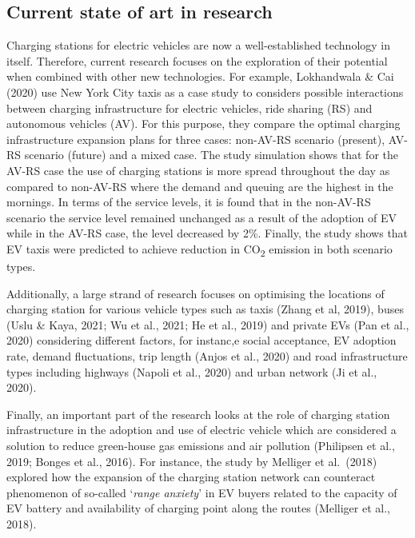 \documentclass[
]{book}
\begin{document}
\hypertarget{current-state-of-art-in-research-7}{%
\subsection*{Current state of art in research}\label{current-state-of-art-in-research-7}}

Charging stations for electric vehicles are now a well-established technology in itself. Therefore, current research focuses on the exploration of their potential when combined with other new technologies. For example, Lokhandwala \& Cai (2020) use New York City taxis as a case study to considers possible interactions between charging infrastructure for electric vehicles, ride sharing (RS) and autonomous vehicles (AV). For this purpose, they compare the optimal charging infrastructure expansion plans for three cases: non-AV-RS scenario (present), AV-RS scenario (future) and a mixed case. The study simulation shows that for the AV-RS case the use of charging stations is more spread throughout the day as compared to non-AV-RS where the demand and queuing are the highest in the mornings. In terms of the service levels, it is found that in the non-AV-RS scenario the service level remained unchanged as a result of the adoption of EV while in the AV-RS case, the level decreased by 2\%. Finally, the study shows that EV taxis were predicted to achieve reduction in CO\textsubscript{2} emission in both scenario types.

Additionally, a large strand of research focuses on optimising the locations of charging station for various vehicle types such as taxis (Zhang et al, 2019), buses (Uslu \& Kaya, 2021; Wu et al., 2021; He et al., 2019) and private EVs (Pan et al., 2020) considering different factors, for instanc,e social acceptance, EV adoption rate, demand fluctuations, trip length (Anjos et al., 2020) and road infrastructure types including highways (Napoli et al., 2020) and urban network (Ji et al., 2020).

Finally, an important part of the research looks at the role of charging station infrastructure in the adoption and use of electric vehicle which are considered a solution to reduce green-house gas emissions and air pollution (Philipsen et al., 2019; Bonges et al., 2016). For instance, the study by Melliger et al.~(2018) explored how the expansion of the charging station network can counteract phenomenon of so-called `\emph{range anxiety}' in EV buyers related to the capacity of EV battery and availability of charging point along the routes (Melliger et al., 2018).
\end{document}
